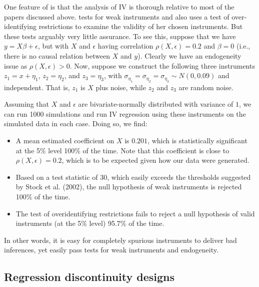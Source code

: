 \documentclass[11pt]{amsart}
\begin{document}
One feature of \citet{Correia:2014fp} is that the analysis of IV is thorough relative to most of the papers discussed above.  \citet{Correia:2014fp} tests for weak instruments and also uses a test of over-identifying restrictions to examine the validity of her chosen instruments. 
But these tests arguably very little assurance.
To see this, suppose that we have $y = X \beta + \epsilon$, but with $X$ and $\epsilon$ having correlation $\rho(X, \epsilon) = 0.2$ and $\beta = 0$ (i.e., there is no causal relation between $X$ and $y$). Clearly we have an endogeneity issue as $\rho(X, \epsilon) > 0$. 
Now, suppose we construct the following three instruments 
$z_1 = x + \eta_1$, $z_2 = \eta_2$, and $z_3 = \eta_3$, with $\sigma_{\eta_1} = \sigma_{\eta_2} = \sigma_{\eta_3} \sim N(0, 0.09)$ and independent. 
That is, $z_1$ is $X$ plus noise, while $z_2$ and $z_3$ are random noise.

Assuming that $X$ and $\epsilon$ are bivariate-normally distributed with variance of $1$, we can run 1000 simulations and  run IV regression using these instruments on the simulated data in each case. Doing so, we find:
\begin{itemize}
\item A mean estimated coefficient on $X$ is $0.201$, which is statistically significant at the
5\% level 100\% of the time. 
Note that this coefficient is close to $\rho(X, \epsilon) = 0.2$, which is to be expected given how our data were generated.
\item Based on a test statistic of 30, which easily exceeds the thresholds suggested by Stock et al. (2002), the null hypothesis of weak instruments is rejected 100\% of the time. 
\item The test of overidentifying restrictions fails to reject a null hypothesis of valid instruments (at the 5\% level) 95.7\% of the time.
\end{itemize}

In other words, it is easy for completely spurious instruments to deliver bad inferences, yet easily pass tests for weak instruments and endogeneity.

\subsection{Regression discontinuity designs} 
\end{document}
